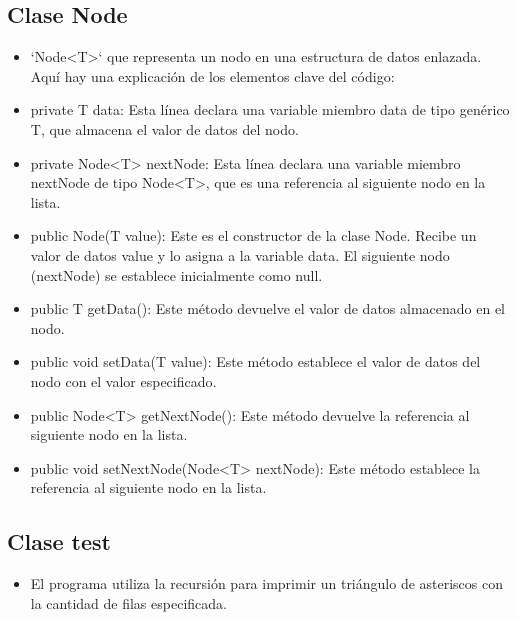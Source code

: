 \documentclass{article}
\begin{document}
\subsection{Clase Node}
\begin{itemize}	
	\item `Node<T>` que representa un nodo en una estructura de datos enlazada. Aquí hay una explicación de los elementos clave del código:
\end{itemize}	

	

\begin{itemize}	
	\item private T data: Esta línea declara una variable miembro data de tipo genérico T, que almacena el valor de datos del nodo.

	\item private Node<T> nextNode: Esta línea declara una variable miembro nextNode de tipo Node<T>, que es una referencia al siguiente nodo en la lista.

	\item public Node(T value): Este es el constructor de la clase Node. Recibe un valor de datos value y lo asigna a la variable data. El siguiente nodo (nextNode) se establece inicialmente como null.

	\item public T getData(): Este método devuelve el valor de datos almacenado en el nodo.

	\item public void setData(T value): Este método establece el valor de datos del nodo con el valor especificado.

	\item public Node<T> getNextNode(): Este método devuelve la referencia al siguiente nodo en la lista.

	\item public void setNextNode(Node<T> nextNode): Este método establece la referencia al siguiente nodo en la lista.
\end{itemize}


\subsection{Clase test}
\begin{itemize}	
	\item El programa utiliza la recursión para imprimir un triángulo de asteriscos con la cantidad de filas especificada.
\end{itemize}	
\end{document}
